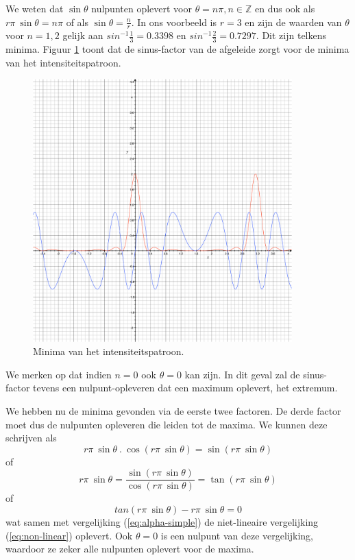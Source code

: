 \documentclass[12pt,a4paper]{article}
\begin{document}
We weten dat $\sin\theta$ nulpunten oplevert voor $\theta = n \pi, n \in \mathbb{Z}$ en dus ook als $r \pi \ \sin\theta = n \pi$ of als $\sin \theta = \frac{n}{r}$. In ons voorbeeld is $r=3$ en zijn de waarden van $\theta$ voor $n = 1, 2$ gelijk aan $sin^{-1} \frac{1}{3} = 0.3398$ en $sin^{-1} \frac{2}{3} = 0.7297$. Dit zijn telkens minima. Figuur \ref{fig:minima} toont dat de sinus-factor van de afgeleide zorgt voor de minima van het intensiteitspatroon.

\begin{figure}
\begin{center}
 \includegraphics[width=100mm]{resources/minima.pdf}
 \caption{Minima van het intensiteitspatroon.}
  \label{fig:minima}
\end{center}
\end{figure}

We merken op dat indien $n = 0$ ook $\theta = 0$ kan zijn. In dit geval zal de sinus-factor tevens een nulpunt-opleveren dat een maximum oplevert, het extremum.

We hebben nu de minima gevonden via de eerste twee factoren. De derde factor moet dus de nulpunten opleveren die leiden tot de maxima. We  kunnen deze schrijven als
\begin{equation} \label{eq:maxima}
r \pi \ \sin \theta \ . \ \cos( r \pi \ \sin \theta) = \sin( r \pi \ \sin \theta)
\end{equation}
of
\begin{equation} \label{eq:maxima2}
r \pi \ \sin \theta = \frac{\sin( r \pi \ \sin \theta)}{\cos( r \pi \ \sin \theta)} = \tan(r \pi \ \sin \theta)
\end{equation}
of
\begin{equation} \label{eq:maxima3}
tan(r \pi \ \sin \theta) - r \pi \ \sin \theta = 0
\end{equation}
wat samen met vergelijking (\ref{eq:alpha-simple}) de niet-lineaire vergelijking (\ref{eq:non-linear}) oplevert. Ook $\theta = 0$ is een nulpunt van deze vergelijking, waardoor ze zeker alle nulpunten oplevert voor de maxima.
\end{document}
